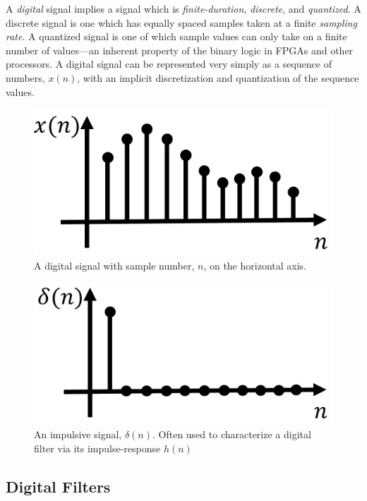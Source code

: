 \documentclass[reprint,amsmath,amssymb,aps,pra]{revtex4-2}
\begin{document}
A \textit{digital} signal implies a signal which is \textit{finite-duration}, \textit{discrete}, and \textit{quantized}. A discrete signal is one which has equally spaced samples taken at a finite \textit{sampling rate}. A quantized signal is one of which sample values can only take on a finite number of values---an inherent property of the binary logic in FPGAs and other processors. A digital signal can be represented very simply as a sequence of numbers, $x(n)$, with an implicit discretization and quantization of the sequence values.

\begin{figure}
    \centering
    \includegraphics[width=0.6\linewidth]{figs/digital_signal.png}
    \caption{A digital signal with sample number, $n$, on the horizontal axis.}
    \label{fig:signal1}
\end{figure}
\begin{figure}
    \centering
    \includegraphics[width=0.6\linewidth]{figs/impulse.png}
    \caption{An impulsive signal, $\delta(n)$. Often used to characterize a digital filter via its impulse-response $h(n)$}
    \label{fig:signal2}
\end{figure}

\subsection{Digital Filters}
\end{document}
